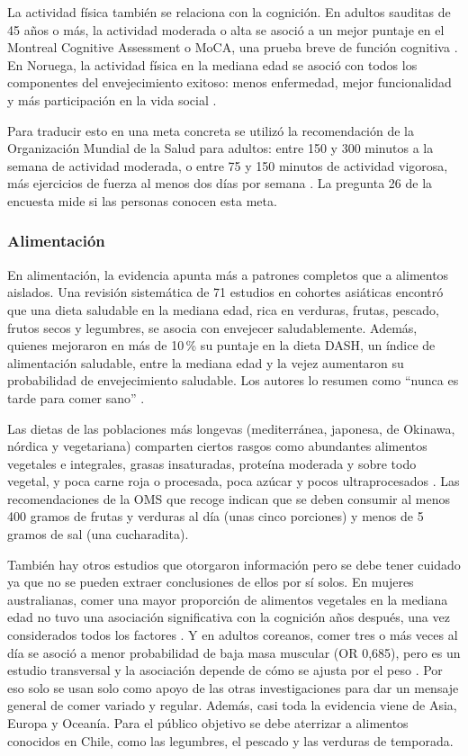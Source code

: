 \documentclass[12pt, letterpaper, table, xcdraw]{extarticle}
\begin{document}
La actividad física también se relaciona con la cognición. En adultos sauditas de 45 años o más, la actividad moderada o alta se asoció a un mejor puntaje en el Montreal Cognitive Assessment o MoCA, una prueba breve de función cognitiva \parencite{naaman2025}. En Noruega, la actividad física en la mediana edad se asoció con todos los componentes del envejecimiento exitoso: menos enfermedad, mejor funcionalidad y más participación en la vida social \parencite{bosnes2019}.

Para traducir esto en una meta concreta se utilizó la recomendación de la Organización Mundial de la Salud para adultos: entre 150 y 300 minutos a la semana de actividad moderada, o entre 75 y 150 minutos de actividad vigorosa, más ejercicios de fuerza al menos dos días por semana \parencite{oms2020}. La pregunta 26 de la encuesta mide si las personas conocen esta meta.

\subsubsection{Alimentación}

En alimentación, la evidencia apunta más a patrones completos que a alimentos aislados. Una revisión sistemática de 71 estudios en cohortes asiáticas encontró que una dieta saludable en la mediana edad, rica en verduras, frutas, pescado, frutos secos y legumbres, se asocia con envejecer saludablemente. Además, quienes mejoraron en más de 10\,\% su puntaje en la dieta DASH, un índice de alimentación saludable, entre la mediana edad y la vejez aumentaron su probabilidad de envejecimiento saludable. Los autores lo resumen como ``nunca es tarde para comer sano'' \parencite{zhou2023}.

Las dietas de las poblaciones más longevas (mediterránea, japonesa, de Okinawa, nórdica y vegetariana) comparten ciertos rasgos como abundantes alimentos vegetales e integrales, grasas insaturadas, proteína moderada y sobre todo vegetal, y poca carne roja o procesada, poca azúcar y pocos ultraprocesados \parencite{dominguez2022}. Las recomendaciones de la OMS que recoge \textcite{puri2023} indican que se deben consumir al menos 400 gramos de frutas y verduras al día (unas cinco porciones) y menos de 5 gramos de sal (una cucharadita).

También hay otros estudios que otorgaron información pero se debe tener cuidado ya que no se pueden extraer conclusiones de ellos por sí solos. En mujeres australianas, comer una mayor proporción de alimentos vegetales en la mediana edad no tuvo una asociación significativa con la cognición años después, una vez considerados todos los factores \parencite{le2025}. Y en adultos coreanos, comer tres o más veces al día se asoció a menor probabilidad de baja masa muscular (OR 0,685), pero es un estudio transversal y la asociación depende de cómo se ajusta por el peso \parencite{chun2025}. Por eso solo se usan solo como apoyo de las otras investigaciones para dar un mensaje general de comer variado y regular. Además, casi toda la  evidencia viene de Asia, Europa y Oceanía. Para el público objetivo se debe aterrizar a alimentos conocidos en Chile, como las legumbres, el pescado y las verduras de temporada.
\end{document}
